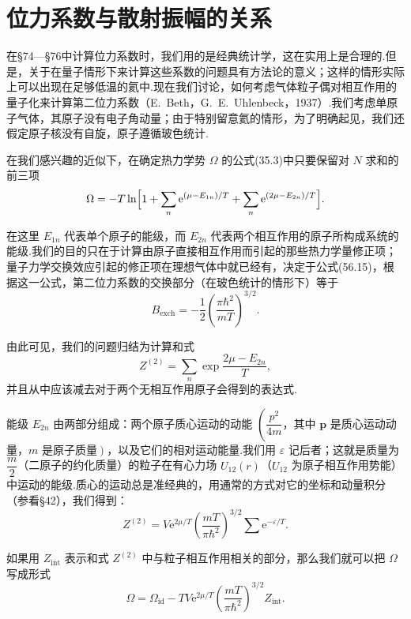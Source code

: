 \section{位力系数与散射振幅的关系}

在§74—§76中计算位力系数时，我们用的是经典统计学，这在实用上是合理的.但是，关于在量子情形下来计算这些系数的问题具有方法论的意义；这样的情形实际上可以出现在足够低温的氦中.现在我们讨论，如何考虑气体粒子偶对相互作用的量子化来计算第二位力系数（E.~Beth，G.~E.~Uhlenbeck，1937）.我们考虑单原子气体，其原子没有电子角动量；由于特别留意氦的情形，为了明确起见，我们还假定原子核没有自旋，原子遵循玻色统计.

在我们感兴趣的近似下，在确定热力学势 $\Omega$ 的公式(35.3)中只要保留对 $N$ 求和的前三项
\begin{equation}
  \Omega=-T\ln\Bigl[1+\sum_n\mathrm{e}^{(\mu-E_{1n})/T}
  +\sum_n\mathrm{e}^{(2\mu-E_{2n})/T}\Bigr].
\end{equation}

在这里 $E_{1n}$ 代表单个原子的能级，而 $E_{2n}$ 代表两个相互作用的原子所构成系统的能级.我们的目的只在于计算由原子直接相互作用而引起的那些热力学量修正项；量子力学交换效应引起的修正项在理想气体中就已经有，决定于公式(56.15)，根据这一公式，第二位力系数的交换部分（在玻色统计的情形下）等于
\begin{equation}
  B_{\mathrm{exch}}=-\frac{1}{2}\left(\frac{\pi\hbar^2}{mT}\right)^{3/2}.
\end{equation}

由此可见，我们的问题归结为计算和式
\begin{equation*}
  Z^{(2)}=\sum_n\exp\frac{2\mu-E_{2n}}{T},
\end{equation*}
并且从中应该减去对于两个无相互作用原子会得到的表达式.

能级 $E_{2n}$ 由两部分组成：两个原子质心运动的动能 $\left(\dfrac{p^2}{4m}\right.$，其中 $\boldsymbol{p}$ 是质心运动动量，$m$ 是原子质量$\left.\right)$，以及它们的相对运动能量.我们用 $\varepsilon$ 记后者；这就是质量为 $\dfrac{m}{2}$（二原子的约化质量）的粒子在有心力场 $U_{12}(r)$（$U_{12}$ 为原子相互作用势能）中运动的能级.质心的运动总是准经典的，用通常的方式对它的坐标和动量积分（参看§42），我们得到：
\begin{equation*}
  Z^{(2)}=V\mathrm{e}^{2\mu/T}\left(\frac{mT}{\pi\hbar^2}\right)^{3/2}\sum\mathrm{e}^{-\varepsilon/T}.
\end{equation*}

如果用 $Z_{\mathrm{int}}$ 表示和式 $Z^{(2)}$ 中与粒子相互作用相关的部分，那么我们就可以把 $\Omega$ 写成形式
\begin{equation*}
  \Omega=\Omega_{\mathrm{id}}-TV\mathrm{e}^{2\mu/T}
  \left(\frac{mT}{\pi\hbar^2}\right)^{3/2}Z_{\mathrm{int}}.
\end{equation*}

